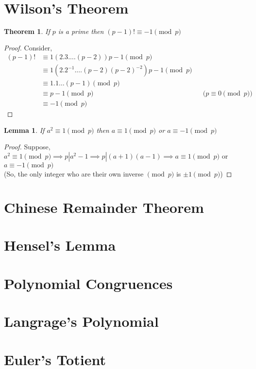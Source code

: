 \documentclass[12pt,a4paper]{article}
\newtheorem{thm}{Theorem}
\newtheorem{lem}{Lemma}
\begin{document}
\section{Wilson's Theorem}
\begin{thm}
	If $p$ is a prime then $(p-1)! \equiv -1 \pmod p$ 
\end{thm}
\begin{proof}
	Consider,
	\begin{align*}
	(p-1)! & \equiv 1(2.3.\dots (p-2)) p-1 \pmod p \\
		& \equiv 1(2.2^{-1}.\dots (p-2)(p-2)^{-2}) p-1 \pmod p \\
		& \equiv 1.1\dots (p-1) \pmod p \\
		& \equiv p-1 \pmod p  && \text{($p \equiv 0 \pmod p$)} \\
		& \equiv -1 \pmod p 
	\end{align*}

\end{proof}

\begin{lem}
	If $a^2 \equiv 1 \pmod p$ then $a \equiv 1 \pmod p$ or $a \equiv -1 \pmod p$ 
\end{lem}
\begin{proof}
	Suppose,  $a^2 \equiv 1 \pmod p \implies p|a^2-1 \implies p|(a+1)(a-1) \implies a \equiv 1 \pmod p$ or $a \equiv -1 \pmod p$\\
	(So, the only integer who are their own inverse $\pmod p$ is $\pm 1 \pmod p$)
\end{proof}


\section{Chinese Remainder Theorem}
\section{Hensel's Lemma}
\section{Polynomial Congruences}
\section{Langrage's Polynomial}
\section{Euler's Totient}
\end{document}
